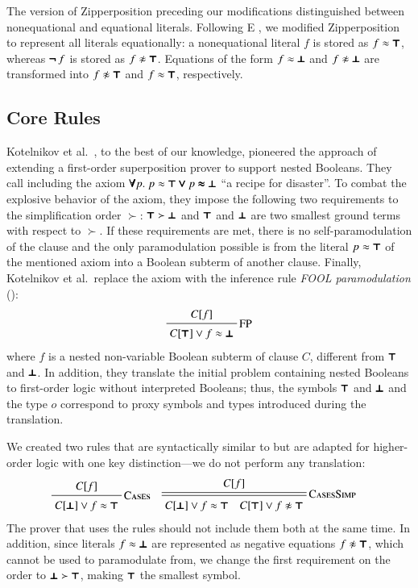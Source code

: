 The version of Zipperposition preceding our modifications distinguished between non\-equational
and equational literals. Following E \cite{scv-19-e23}, we
modified Zipperposition to represent all literals equationally: a nonequational
literal $f$ is stored as $f \approx \pmb{\top}$, whereas $\pmb{\neg\,} f$ is stored as $f
\noteq \itrue$. Equations of the form $f \approx \pmb{\bot} $ and $f \noteq \ifalse$ are
transformed into $f \noteq \itrue$ and $f \approx \pmb{\top}$, respectively.

\subsection{Core Rules}
\label{subsect:bool:core}

Kotelnikov et al.\ \cite{kotelnikov-15-fool}, to the best of our
knowledge, pioneered the approach of extending a first-order superposition prover to support
nested Booleans. They call including the axiom $\pmb{\forall}
p. \; p \approx \pmb{\top} \pmb{\lor} p \pmb{\approx} \pmb{\bot}$  ``a recipe for disaster''. To combat the
explosive behavior of the axiom, they impose the following two requirements to
the simplification order $\succ$: $\pmb{\top} \succ \pmb{\bot}$ and
$\pmb{\top}$ and $\pmb{\bot}$ are two smallest ground terms with respect to $\succ$. If
these requirements are met, there is no self-paramodulation of the clause
and the only paramodulation possible is from the literal $p \approx \pmb{\top}$ of the mentioned axiom
into a Boolean subterm of another clause. Finally, Kotelnikov et al.\ replace
the axiom with the inference rule \emph{FOOL paramodulation} ():
\pagebreak[2]
%
$$ \namedinference{FP}{C[f]}{C[\itrue] \vee f \eq \ifalse} $$
%
where $f$ is a nested non-variable Boolean subterm of clause $C$, different from
$\pmb{\top}$ and $\pmb{\bot}$. In addition, they translate the initial problem containing nested
Booleans  to first-order logic without interpreted Booleans; thus, the symbols $\pmb{\top}$ and $\pmb{\bot}$ and the type $o$
correspond to proxy symbols and types introduced during the translation. 

We created two rules that are syntactically similar to  but
are adapted for higher-order logic with one key distinction---we do not perform any translation:
%
\begin{align*}
  & \namedinference{Cases}{C[f]}{C[\ifalse] \vee f \eq \itrue}
  && \namedsimp{CasesSimp}{C[f]}{C[\ifalse] \vee f \eq \itrue \quad C[\itrue] \vee f \noteq \itrue}
\end{align*}
%
The prover that uses the rules should not include them both at the same time.
In addition, since
literals $f \approx \pmb{\bot}$ are represented as negative equations $f \noteq \itrue$, which cannot be used to paramodulate from,
we change the first requirement on the order to $\pmb{\bot} \succ
\pmb{\top}$, making $\pmb{\top}$ the smallest symbol.

